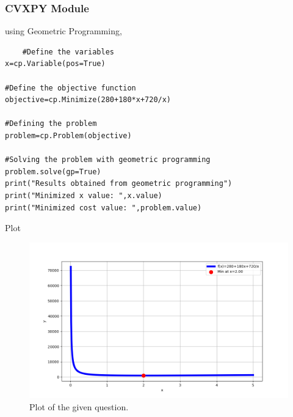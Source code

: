 \documentclass{beamer}
\begin{document}
\begin{frame}[fragile]
\frametitle{CVXPY Module}
using Geometric Programming,
\begin{verbatim}
    #Define the variables
x=cp.Variable(pos=True)

#Define the objective function
objective=cp.Minimize(280+180*x+720/x)

#Defining the problem 
problem=cp.Problem(objective)

#Solving the problem with geometric programming
problem.solve(gp=True)
print("Results obtained from geometric programming")
print("Minimized x value: ",x.value)
print("Minimized cost value: ",problem.value)
\end{verbatim} 
\end{frame}
\begin{frame}{Plot}
\begin{figure}[h]
\centering
\includegraphics[width=\columnwidth]{figs/Q4.png}
\caption{Plot of the given question.}
\label{fig:Plot1} 
\end{figure}
    
\end{frame}
\end{document}
